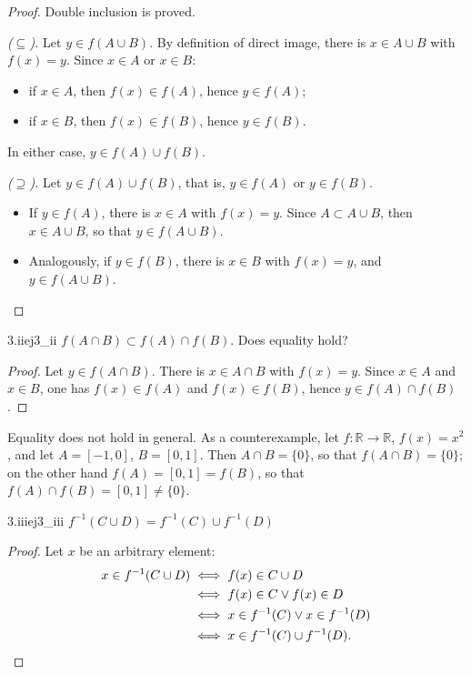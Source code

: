 \documentclass[11pt, a4paper]{article}
\begin{document}
\begin{proof}
Double inclusion is proved.

\textit{($\subseteq$).} Let $y \in f(A \cup B)$. By definition of direct image, there is
$x \in A \cup B$ with $f(x) = y$. Since $x \in A$ or $x \in B$:
\begin{itemize}
    \item if $x \in A$, then $f(x) \in f(A)$, hence $y \in f(A)$;
    \item if $x \in B$, then $f(x) \in f(B)$, hence $y \in f(B)$.
\end{itemize}
In either case, $y \in f(A) \cup f(B)$.

\textit{($\supseteq$).} Let $y \in f(A) \cup f(B)$, that is, $y \in f(A)$ or $y \in f(B)$.
\begin{itemize}
    \item If $y \in f(A)$, there is $x \in A$ with $f(x) = y$. Since $A \subset A \cup B$, then
    $x \in A \cup B$, so that $y \in f(A \cup B)$.
    \item Analogously, if $y \in f(B)$, there is $x \in B$ with $f(x) = y$, and $y \in f(A \cup B)$.
\end{itemize}
\end{proof}

\begin{proposicion}{3.ii}{ej3_ii}
$f(A\cap B)\subset f(A)\cap f(B)$. Does equality hold?
\end{proposicion}

\begin{proof}
Let $y \in f(A \cap B)$. There is $x \in A \cap B$ with $f(x) = y$. Since $x \in A$ and $x \in B$, one has
$f(x) \in f(A)$ and $f(x) \in f(B)$, hence $y \in f(A) \cap f(B)$.
\end{proof}

Equality does not hold in general. As a counterexample, let $f: \mathbb{R} \to \mathbb{R}$, $f(x) = x^2$,
and let $A = [-1, 0]$, $B = [0, 1]$. Then $A \cap B = \{0\}$, so that $f(A \cap B) = \{0\}$;
on the other hand $f(A) = [0, 1] = f(B)$, so that $f(A) \cap f(B) = [0, 1] \neq \{0\}$.

\begin{proposicion}{3.iii}{ej3_iii}
$f^{-1}(C\cup D)=f^{-1}(C)\cup f^{-1}(D)$
\end{proposicion}

\begin{proof}
Let $x$ be an arbitrary element:
\begin{align*}
x \in f^{-1}(C \cup D) &\iff f(x) \in C \cup D \\
&\iff f(x) \in C \lor f(x) \in D \\
&\iff x \in f^{-1}(C) \lor x \in f^{-1}(D) \\
&\iff x \in f^{-1}(C) \cup f^{-1}(D). \qedhere
\end{align*}
\end{proof}
\end{document}
